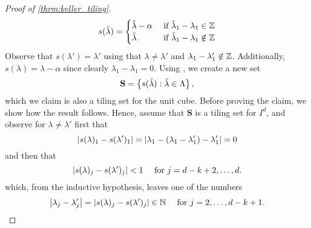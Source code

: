 \documentclass[../thesis.tex]{subfiles}
\begin{document}
\begin{proof}[Proof of \cref{thrm:keller_tiling}]
    \begin{equation}\label{eq:s_function}
        s(\tilde{\lambda}) = 
        \begin{cases}
            \tilde{\lambda} - \alpha & \text{ if } \tilde{\lambda}_1-\lambda_1 \in \mathbb{Z}\\
            \tilde{\lambda} & \text{ if } \tilde{\lambda}_1-\lambda_1 \notin \mathbb{Z}\\
        \end{cases}
    \end{equation}
    Observe that $s(\lambda')=\lambda'$ using that  $\lambda \neq \lambda'$ and $\lambda_{1}-\lambda_{1}' \notin \mathbb{Z}$. Additionally, $s(\lambda)=\lambda-\alpha$ since clearly $\lambda_{1}-\lambda_{1} = 0$. Using , we create a new set 
    \begin{equation*}
        \mathbf{S} = \left\{s(\tilde{\lambda}) :\tilde{\lambda} \in  \Lambda \right\},
    \end{equation*}
    which we claim is also a tiling set for the unit cube. Before proving the claim, we show how the result follows. Hence, assume that $\mathbf{S}$ is a tiling set for $I^d$, and observe for $\lambda\neq \lambda'$ first that 
    \begin{equation*}
        \left| s(\lambda)_1 - s(\lambda')_1\right| = \left|\lambda_1 - \left(\lambda_1-\lambda_1'\right) - \lambda_1'\right| = 0
    \end{equation*}
    and then that
    \begin{equation*}
        \left| s(\lambda)_j - s(\lambda')_j\right| < 1 \quad \text{ for } j= d-k+2,\dots,d.
    \end{equation*}
    which, from the inductive hypothesis, leaves one of the numbers 
    \begin{equation*}
        \left|\lambda_j - \lambda_j'\right| = \left|s(\lambda)_j - s(\lambda')_j\right| \in \mathbb{N} \quad \text{ for } j = 2,\dots, d-k+1.
    \end{equation*}


\end{proof}
\end{document}
